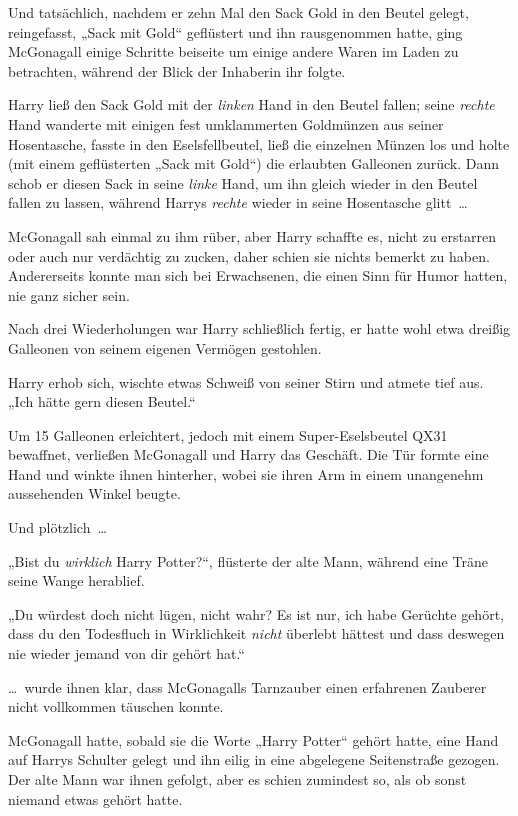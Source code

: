 Und tatsächlich, nachdem er zehn Mal den Sack Gold in den Beutel gelegt, reingefasst, „Sack mit Gold“ geflüstert und ihn rausgenommen hatte, ging McGonagall einige Schritte beiseite um einige andere Waren im Laden zu betrachten, während der Blick der Inhaberin ihr folgte.

Harry ließ den Sack Gold mit der \emph{linken} Hand in den Beutel fallen; seine \emph{rechte} Hand wanderte mit einigen fest umklammerten Goldmünzen aus seiner Hosentasche, fasste in den Eselsfellbeutel, ließ die einzelnen Münzen los und holte (mit einem geflüsterten „Sack mit Gold“) die erlaubten Galleonen zurück. Dann schob er diesen Sack in seine \emph{linke} Hand, um ihn gleich wieder in den Beutel fallen zu lassen, während Harrys \emph{rechte} wieder in seine Hosentasche glitt …

McGonagall sah einmal zu ihm rüber, aber Harry schaffte es, nicht zu erstarren oder auch nur verdächtig zu zucken, daher schien sie nichts bemerkt zu haben. Andererseits konnte man sich bei Erwachsenen, die einen Sinn für Humor hatten, nie ganz sicher sein.

Nach drei Wiederholungen war Harry schließlich fertig, er hatte wohl etwa dreißig Galleonen von seinem eigenen Vermögen gestohlen.

Harry erhob sich, wischte etwas Schweiß von seiner Stirn und atmete tief aus. „Ich hätte gern diesen Beutel.“

Um 15 Galleonen erleichtert, jedoch mit einem Super-Eselsbeutel QX31 bewaffnet, verließen McGonagall und Harry das Geschäft. Die Tür formte eine Hand und winkte ihnen hinterher, wobei sie ihren Arm in einem unangenehm aussehenden Winkel beugte.

Und plötzlich …

„Bist du \emph{wirklich} Harry Potter?“, flüsterte der alte Mann, während eine Träne seine Wange herablief.

„Du würdest doch nicht lügen, nicht wahr? Es ist nur, ich habe Gerüchte gehört, dass du den Todesfluch in Wirklichkeit \emph{nicht} überlebt hättest und dass deswegen nie wieder jemand von dir gehört hat.“

… wurde ihnen klar, dass McGonagalls Tarnzauber einen erfahrenen Zauberer nicht vollkommen täuschen konnte.

McGonagall hatte, sobald sie die Worte „Harry Potter“ gehört hatte, eine Hand auf Harrys Schulter gelegt und ihn eilig in eine abgelegene Seitenstraße gezogen. Der alte Mann war ihnen gefolgt, aber es schien zumindest so, als ob sonst niemand etwas gehört hatte.

